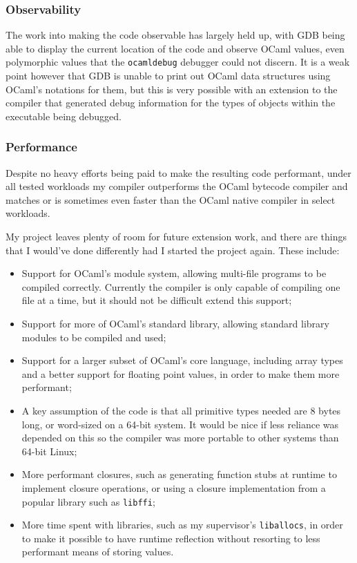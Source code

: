 \documentclass[12pt,a4paper,twoside,openright]{report}
\begin{document}
\subsubsection{Observability}
The work into making the code observable has largely held up, with GDB being 
able to display the current location of the code and observe OCaml values, even 
polymorphic values that the \texttt{ocamldebug} debugger could not discern. It 
is a weak point however that GDB is unable to print out OCaml data structures 
using OCaml's notations for them, but this is very possible with an extension 
to the compiler that generated debug information for the types of objects 
within the executable being debugged.

\subsubsection{Performance}
Despite no heavy efforts being paid to make the resulting code performant, 
under all tested workloads my compiler outperforms the OCaml bytecode compiler 
and matches or is sometimes even faster than the OCaml native compiler in 
select workloads.

My project leaves plenty of room for future extension work, and there are 
things that I would've done differently had I started the project again. These 
include:

\begin{itemize}
    \item Support for OCaml's module system, allowing multi-file programs to be 
    compiled correctly. Currently the compiler is only capable of compiling one 
    file at a time, but it should not be difficult extend this support;
    \item Support for more of OCaml's standard library, allowing standard 
    library modules to be compiled and used;
    \item Support for a larger subset of OCaml's core language, including array 
    types and a better support for floating point values, in order to make them 
    more performant;
    \item A key assumption of the code is that all primitive types needed are 8 
    bytes long, or word-sized on a 64-bit system. It would be nice if less 
    reliance was depended on this so the compiler was more portable to other 
    systems than 64-bit Linux;
    \item More performant closures, such as generating function stubs at 
    runtime to implement closure operations, or using a closure implementation 
    from a popular library such as \texttt{libffi};
    \item More time spent with libraries, such as my supervisor's 
    \texttt{liballocs}, in order to make it possible to have runtime reflection 
    without resorting to less performant means of storing values.
\end{itemize}
\end{document}

